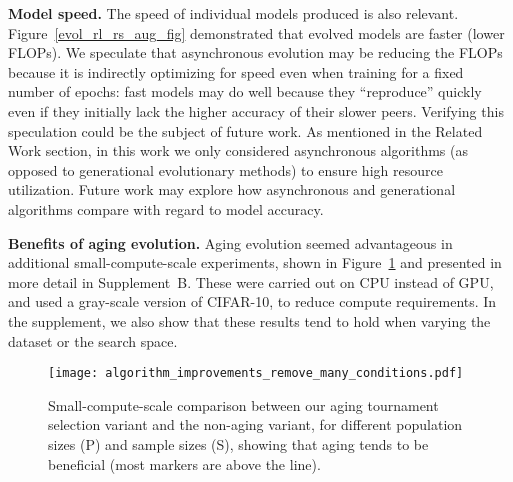 \documentclass[letterpaper]{article} \usepackage{aaai19}  \usepackage{times}  \usepackage{helvet}  \usepackage{courier}  \usepackage{graphicx}  \frenchspacing
\begin{document}
\textbf{Model speed.} The speed of individual models produced is also relevant. Figure~\ref{evol_rl_rs_aug_fig} demonstrated that evolved models are faster (lower FLOPs). We speculate that asynchronous evolution may be reducing the FLOPs because it is indirectly optimizing for speed even when training for a fixed number of epochs: fast models may do well because they ``reproduce'' quickly even if they initially lack the higher accuracy of their slower peers. Verifying this speculation could be the subject of future work. As mentioned in the Related Work section, in this work we only considered asynchronous algorithms (as opposed to generational evolutionary methods) to ensure high resource utilization. Future work may explore how asynchronous and generational algorithms compare with regard to model accuracy.

\textbf{Benefits of aging evolution.} Aging evolution seemed advantageous in additional small-compute-scale experiments, shown in Figure~\ref{aging_vs_non_aging_fig} and presented in more detail in Supplement~B. These were carried out on CPU instead of GPU, and used a gray-scale version of CIFAR-10, to reduce compute requirements. In the supplement, we also show that these results tend to hold when varying the dataset or the search space.

\begin{figure}[ht]
\centering
\texttt{[image: algorithm\_improvements\_remove\_many\_conditions.pdf]}
\caption{Small-compute-scale comparison between our aging tournament selection variant and the non-aging variant, for different population sizes (P) and sample sizes (S), showing that aging tends to be beneficial (most markers are above the  line).}
\label{aging_vs_non_aging_fig}
\end{figure}
\end{document}
